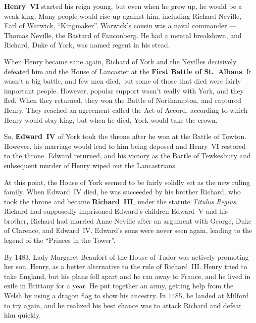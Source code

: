 \textbf{Henry~VI} started his reign young, but even when he grew up, he would be a weak king.
Many people would rise up against him, including Richard Neville, Earl of Warwick, ``Kingmaker''.
Warwick's cousin was a naval commander --- Thomas Neville, the Bastard of Fauconberg.
He had a mental breakdown, and Richard, Duke of York, was named regent in his stead.

When Henry became sane again, Richard of York and the Nevilles decisively defeated
him and the House of Lancaster at the \textbf{First Battle of St.\ Albans}.
It wasn't a big battle, and few men died, but some of those that died were fairly important people.
However, popular support wasn't really with York, and they fled.
When they returned, they won the Battle of Northampton, and captured Henry.
They reached an agreement called the Act of Accord, according to which Henry would stay king,
but when he died, York would take the crown.

So, \textbf{Edward~IV} of York took the throne after he won at the Battle of Towton.
However, his marriage would lead to him being deposed and Henry~VI restored to the throne.
Edward returned, and his victory as the Battle of Tewkesbury
and subsequent murder of Henry wiped out the Lancastrians.

At this point, the House of York seemed to be fairly solidly set as the new ruling family.
When Edward~IV died, he was succeeded by his brother Richard,
who took the throne and became \textbf{Richard~III}, under the statute \textit{Titulus Regius}.
Richard had supposedly imprisoned Edward's children Edward~V and his brother,
Richard had married Anne Neville after an argument with George, Duke of Clarence, and Edward~IV\@.
Edward's sons were never seen again,
leading to the legend of the ``Princes in the Tower''.

By 1483, Lady Margaret Beaufort of the House of Tudor was actively promoting her son, Henry,
as a better alternative to the rule of Richard~III\@.
Henry tried to take England, but his plans fell apart and he ran away to France,
and he lived in exile in Brittany for a year.
He put together an army, getting help from the Welsh by using a dragon flag to show his ancestry.
In 1485, he landed at Milford to try again,
and he realized his best chance was to attack Richard and defeat him quickly.

